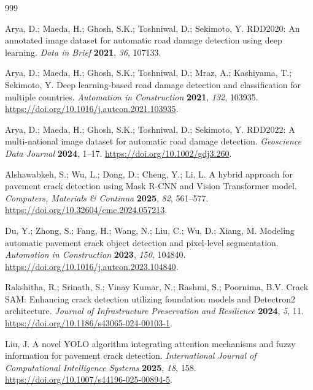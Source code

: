 \documentclass[applsci,article,submit,moreauthors]{Definitions/mdpi}
\begin{document}
\begin{thebibliography}{999}

Arya, D.; Maeda, H.; Ghosh, S.K.; Toshniwal, D.; Sekimoto, Y. RDD2020: An annotated image dataset for automatic road damage detection using deep learning. \textit{Data in Brief} \textbf{2021}, \textit{36}, 107133.

Arya, D.; Maeda, H.; Ghosh, S.K.; Toshniwal, D.; Mraz, A.; Kashiyama, T.; Sekimoto, Y. Deep learning-based road damage detection and classification for multiple countries. \textit{Automation in Construction} \textbf{2021}, \textit{132}, 103935. \url{https://doi.org/10.1016/j.autcon.2021.103935}.

Arya, D.; Maeda, H.; Ghosh, S.K.; Toshniwal, D.; Sekimoto, Y. RDD2022: A multi-national image dataset for automatic road damage detection. \textit{Geoscience Data Journal} \textbf{2024}, 1--17. \url{https://doi.org/10.1002/gdj3.260}.

Alshawabkeh, S.; Wu, L.; Dong, D.; Cheng, Y.; Li, L. A hybrid approach for pavement crack detection using Mask R-CNN and Vision Transformer model. \textit{Computers, Materials \& Continua} \textbf{2025}, \textit{82}, 561--577. \url{https://doi.org/10.32604/cmc.2024.057213}.

Du, Y.; Zhong, S.; Fang, H.; Wang, N.; Liu, C.; Wu, D.; Xiang, M. Modeling automatic pavement crack object detection and pixel-level segmentation. \textit{Automation in Construction} \textbf{2023}, \textit{150}, 104840. \url{https://doi.org/10.1016/j.autcon.2023.104840}.

Rakshitha, R.; Srinath, S.; Vinay Kumar, N.; Rashmi, S.; Poornima, B.V. Crack SAM: Enhancing crack detection utilizing foundation models and Detectron2 architecture. \textit{Journal of Infrastructure Preservation and Resilience} \textbf{2024}, \textit{5}, 11. \url{https://doi.org/10.1186/s43065-024-00103-1}.

Liu, J. A novel YOLO algorithm integrating attention mechanisms and fuzzy information for pavement crack detection. \textit{International Journal of Computational Intelligence Systems} \textbf{2025}, \textit{18}, 158. \url{https://doi.org/10.1007/s44196-025-00894-5}.


\end{thebibliography}
\end{document}
